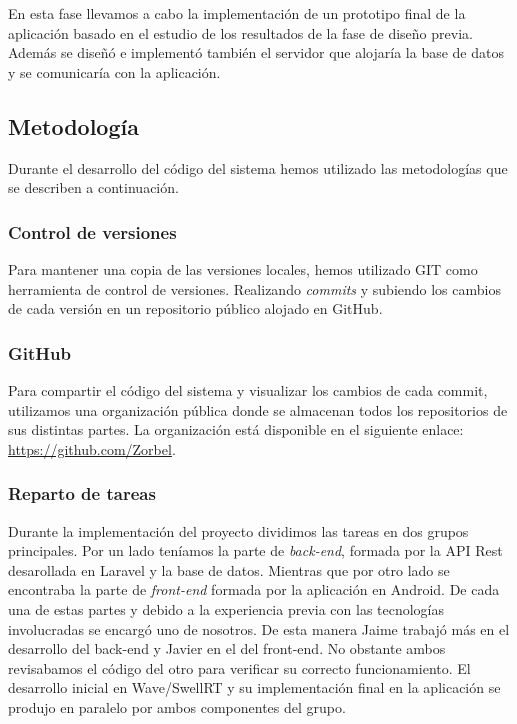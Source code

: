 En esta fase llevamos a cabo la implementación de un prototipo final de la aplicación basado en el estudio de los resultados de la fase de diseño previa. Además se diseñó e implementó también el servidor que alojaría la base de datos y se comunicaría con la aplicación.

\subsection{Metodología}

Durante el desarrollo del código del sistema hemos utilizado las metodologías que se describen a continuación.

\subsubsection{Control de versiones}

Para mantener una copia de las versiones locales, hemos utilizado GIT como herramienta de control de versiones. Realizando \textit{commits} y subiendo los cambios de cada versión en un repositorio público alojado en GitHub.

\subsubsection{GitHub}

Para compartir el código del sistema y visualizar los cambios de cada commit, utilizamos una organización pública donde se almacenan todos los repositorios de sus distintas partes. La organización está disponible en el siguiente enlace: \url{https://github.com/Zorbel}.

\subsubsection{Reparto de tareas}

Durante la implementación del proyecto dividimos las tareas en dos grupos principales. Por un lado teníamos la parte de \textit{back-end}, formada por la API Rest desarollada en Laravel y la base de datos. Mientras que por otro lado se encontraba la parte de \textit{front-end} formada por la aplicación en Android. De cada una de estas partes y debido a la experiencia previa con las tecnologías involucradas se encargó uno de nosotros. De esta manera Jaime trabajó más en el desarrollo del back-end y Javier en el del front-end. No obstante ambos revisabamos el código del otro para verificar su correcto funcionamiento. El desarrollo inicial en Wave/SwellRT y su implementación final en la aplicación se produjo en paralelo por ambos componentes del grupo.

